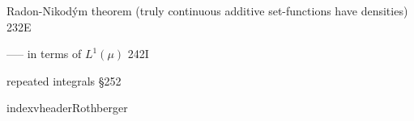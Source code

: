 Radon-Nikod\'ym theorem (truly continuous additive set-functions
have densities) 232E


----- in terms of $L^1(\mu)$ 242I





























repeated integrals \S252







































indexvheader{Rothberger}




\indexmedskip
































































